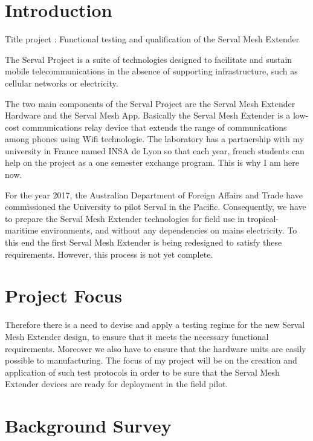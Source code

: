 \documentclass[a4paper, 11pt, oneside]{Thesis}  %
\begin{document}
\section{Introduction}
Title project : \Large Functional testing and qualification of the Serval Mesh Extender
\normalsize \par
The Serval Project is a suite of technologies designed to facilitate and sustain mobile telecommunications in the absence of supporting infrastructure, such as cellular networks or electricity. \par The two main components of the Serval Project are the Serval Mesh Extender Hardware and the Serval Mesh App. Basically the Serval Mesh Extender is a low-cost communications relay device that extends the range of communications among phones using Wifi technologie. The laboratory has a partnership with my university in France named INSA de Lyon so that each year, french students can help on the project as a one semester exchange program. This is why I am here now.  

For the year 2017, the Australian Department of Foreign Affairs and Trade have commissioned the University to pilot Serval in the Pacific. Consequently, we have to prepare the Serval Mesh Extender technologies for field use in tropical-maritime environments, and without any dependencies on mains electricity. To this end the first Serval Mesh Extender is being redesigned to satisfy these requirements. However, this process is not yet complete. \par

\section{Project Focus}

Therefore there is a need to devise and apply a testing regime for the new Serval Mesh Extender design, to ensure that it meets the necessary functional requirements. Moreover we also have to ensure that the hardware units are easily possible to manufacturing. The focus of my project will be on the creation and application of such test protocols in order to be sure that the Serval Mesh Extender devices are ready for deployment in the field pilot. 

\section{Background Survey}
\end{document}
